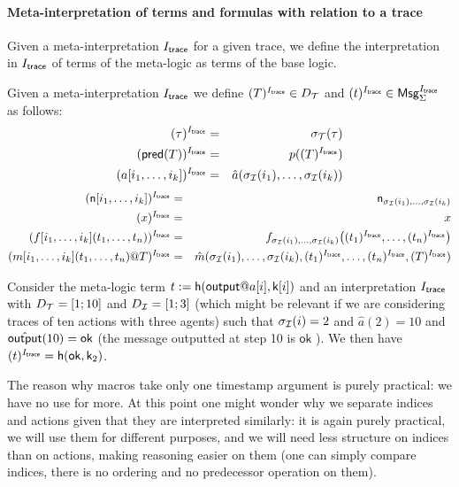 \paragraph{Meta-interpretation of terms and formulas with relation to a trace}

Given a meta-interpretation $I_{\textsf{trace}}$ for a given trace, we define the
interpretation in $I_{\textsf{trace}}$ of terms of the meta-logic as terms of the base logic.

\begin{definition}
  Given a meta-interpretation $I_{\textsf{trace}}$
  we define $(T)^{I_{\textsf{trace}}} \in D_{\mathcal{T}}$ and $(t)^{I_{\textsf{trace}}} \in \mathsf{Msg}^{I_{\textsf{trace}}}_\Sigma$ as follows:
  \begin{eqnarray*}
    (\tau)^{I_{\textsf{trace}}} &=& \sigma_{\mathcal{T}}(\tau) \\
    (\textsf{pred}(T))^{I_{\textsf{trace}}} &=& p((T)^{I_{\textsf{trace}}}) \\
    (a[i_1,\ldots,i_k])^{I_{\textsf{trace}}} &=& \hat{a}(\sigma_{\mathcal{I}}(i_1),\ldots,\sigma_{\mathcal{I}}(i_k))
  \end{eqnarray*}
  \begin{eqnarray*}
    (\mathsf{n}[i_1,\ldots,i_k])^{I_{\textsf{trace}}} &=& \mathsf{n}_{\sigma_{\mathcal{I}}(i_1),\ldots,\sigma_{\mathcal{I}}(i_k)}
    \\
    (x)^{I_{\textsf{trace}}} &=& x
    \\
    (f[i_1,\ldots,i_k](t_1,\ldots,t_n))^{I_{\textsf{trace}}} &=&
    f_{\sigma_{\mathcal{I}}(i_1),\ldots,\sigma_{\mathcal{I}}(i_k)}\bigl(
      (t_1)^{I_{\textsf{trace}}},\ldots,(t_n)^{I_{\textsf{trace}}}
    \bigr)
    \\
    (m[i_1,\ldots,i_k](t_1,\ldots,t_n)@T)^{I_{\textsf{trace}}} &=&
    \hat{m}(\sigma_{\mathcal{I}}(i_1),\ldots,\sigma_{\mathcal{I}}(i_k),
      (t_1)^{I_{\textsf{trace}}},\ldots,(t_n)^{I_{\textsf{trace}}},
      (T)^{I_{\textsf{trace}}})
  \end{eqnarray*}
\end{definition}

\begin{example}
  Consider the meta-logic term $t := \mathsf{h}(\mout@a[i],\mathsf{k}[i])$
  and an interpretation $I_{\textsf{trace}}$ with $D_{\mathcal{T}} = [1;10]$ and $D_{\mathcal{I}} = [1;3]$
  (which might be relevant if we are considering traces of ten actions
  with three agents) such that $\sigma_{\mathcal{I}}(i)=2$ and $\hat{a}(2)=10$
  and $\hat{\textsf{output}}(10)=\mathsf{ok}$ (the message outputted at step 10
  is $\mathsf{ok}$ ).
  We then have $(t)^{I_{\textsf{trace}}} = \mathsf{h}(\mathsf{ok},\mathsf{k}_2)$.
\end{example}

The reason why macros take only one timestamp argument is purely practical:
we have no use for more. At this point one might wonder why we separate
indices and actions given that they are interpreted similarly: it is again
purely practical, we will use them for different purposes, and we will need
less structure on indices than on actions, making reasoning easier on them
(one can simply compare indices, there is no ordering and no predecessor
operation on them).



